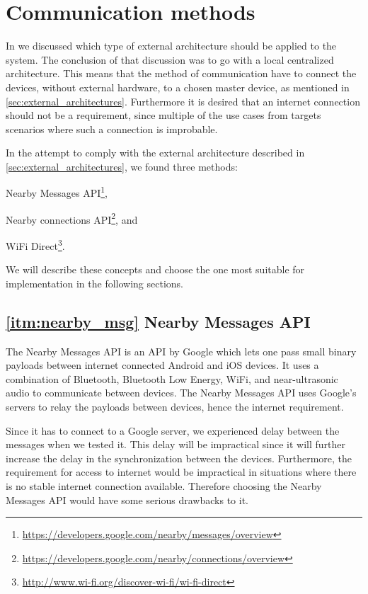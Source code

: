 \section{Communication methods}\label{sec:communication_methods}
In  we discussed which type of external architecture should be applied to the system.
The conclusion of that discussion was to go with a local centralized architecture.
This means that the method of communication have to connect the devices, without external hardware, to a chosen master device, as mentioned in \cref{sec:external_architectures}.
Furthermore it is desired that an internet connection should not be a requirement, since multiple of the use cases from  targets scenarios where such a connection is improbable.

In the attempt to comply with the external architecture described in \cref{sec:external_architectures}, we found three methods:
\begin{enumberate*}
\item Nearby Messages API\footnote{\url{https://developers.google.com/nearby/messages/overview}}, \label{itm:nearby_msg}
\item Nearby connections API\footnote{\url{https://developers.google.com/nearby/connections/overview}}, and \label{itm:nearby_conn}
\item WiFi Direct\footnote{\url{http://www.wi-fi.org/discover-wi-fi/wi-fi-direct}}. \label{itm:wifi_direct}
\end{enumberate*}
We will describe these concepts and choose the one most suitable for implementation in the following sections.

\subsection*{\ref{itm:nearby_msg} Nearby Messages API}
The Nearby Messages API is an API by Google which lets one pass small binary payloads between internet connected Android and iOS devices.
It uses a combination of Bluetooth, Bluetooth Low Energy, WiFi, and near-ultrasonic audio to communicate between devices.
The Nearby Messages API uses Google's servers to relay the payloads between devices, hence the internet requirement.\cite{nearby_messages}

Since it has to connect to a Google server, we experienced delay between the messages when we tested it.
This delay will be impractical since it will further increase the delay in the synchronization between the devices.
Furthermore, the requirement for access to internet would be impractical in situations where there is no stable internet connection available.
Therefore choosing the Nearby Messages API would have some serious drawbacks to it.

